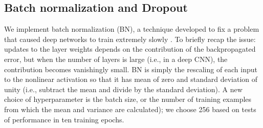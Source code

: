 \documentclass[fleqn,usenatbib]{mnras}
\begin{document}
\subsection{Batch normalization and Dropout}\label{sec:norm and drop}

We implement batch normalization (BN), a technique developed to fix a problem that caused deep networks to train extremely slowly \citep{batchnorm}.
To briefly recap the issue: updates to the layer weights depends on the contribution of the backpropagated error, but when the number of layers is large (i.e., in a deep CNN), the contribution becomes vanishingly small.
BN is simply the rescaling of each input to the nonlinear activation so that it has mean of zero and standard deviation of unity (i.e., subtract the mean and divide by the standard deviation).
A new choice of hyperparameter is the batch size, or the number of training examples from which the mean and variance are calculated); we choose 256 based on tests of performance in ten training epochs.

\end{document}
